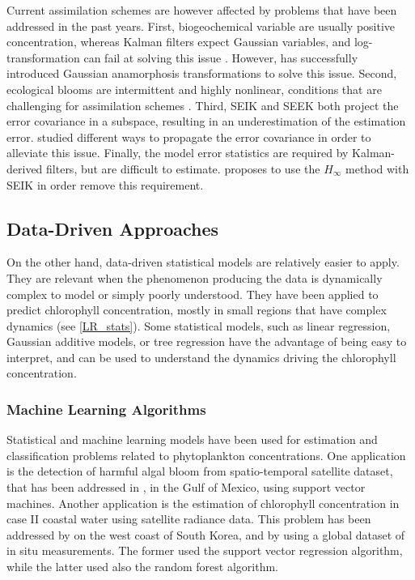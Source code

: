 Current assimilation schemes are however affected by problems that have been addressed in the past years. First, biogeochemical variable are usually positive concentration, whereas Kalman filters expect Gaussian variables, and log-transformation can fail at solving this issue \cite{Ciavatta2011}. However, \cite{Fontana2013} has successfully introduced Gaussian anamorphosis transformations to solve this issue. Second, ecological blooms are intermittent and highly nonlinear, conditions that are challenging for assimilation schemes \cite{Triantafyllou2012, Korres2012}. Third, SEIK and SEEK both project the error covariance in a subspace, resulting in an underestimation of the estimation error. \cite{Butenschon2012} studied different ways to propagate the error covariance in order to alleviate this issue. Finally, the model error statistics are required by Kalman-derived filters, but are difficult to estimate. \cite{Triantafyllou2012} proposes to use the $H_\infty$ method with SEIK in order remove this requirement.

\subsection{Data-Driven Approaches}

On the other hand, data-driven statistical models are relatively easier to apply. They are relevant when the phenomenon producing the data is dynamically complex to model or simply poorly understood. They have been applied to predict chlorophyll concentration, mostly in small regions that have complex dynamics (see \ref{LR_stats}). Some statistical models, such as linear regression, Gaussian additive models, or tree regression have the advantage of being easy to interpret, and can be used to understand the dynamics driving the chlorophyll concentration.

\subsubsection{Machine Learning Algorithms}

Statistical and machine learning models have been used for estimation and classification problems related to phytoplankton concentrations. One application is the detection of harmful algal bloom from spatio-temporal satellite dataset, that has been addressed in \cite{Gokaraju2011}, in the Gulf of Mexico, using support vector machines. Another application is the estimation of chlorophyll concentration in case II coastal water using satellite radiance data. This problem has been addressed by \cite{Kim2014} on the west coast of South Korea, and by \cite{Camps-Valls2006} using a global dataset of in situ measurements. The former used the support vector regression algorithm, while the latter used also the random forest algorithm.

